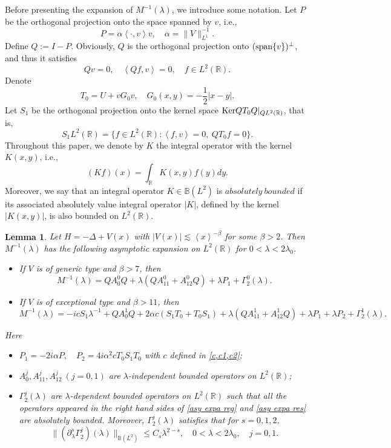\documentclass[reqno]{amsart}
\newtheorem{lemma}[definition]{Lemma}
\newcommand\R{\mathbb{R}}
\newcommand\B{\mathbb{B}}
\numberwithin{equation}{section}
\begin{document}
Before presenting the expansion of $M^{-1}(\lambda)$, we introduce some notation. Let $P$ be the orthogonal projection onto the space spanned by $v$, i.e.,
$$P=\alpha\left<\cdot,v\right>v,\quad \alpha=\|V\|^{-1}_{L^1}.$$
Define $Q:=I-P$. Obviously, $Q$ is the orthogonal projection onto $({\rm span}\{v\})^{\bot}$, and thus it satisfies 
$$Qv=0,\quad \left<Qf,v\right>=0,\quad f\in 
 L^2(\R).$$
Denote $$T_0=U+vG_0v,\quad G_0(x,y)=-\frac{1}{2}|x-y|.$$ 
Let $S_1$ be the orthogonal projection onto the kernel space ${\rm Ker}QT_0Q|_{QL^2(\R)}$, that is,
$$S_1L^2(\R)=\{f\in L^2(\R):\left<f,v\right>=0,\ QT_0f=0\}.$$
Throughout this paper, we denote by $K$ the integral operator with the kernel $K(x,y)$, i.e.,
$$(Kf)(x)=\int_{\R}{}K(x,y)f(y)dy.$$
Moreover, we say that an integral operator $K\in\B(L^2)$ is $absolutely\ bounded$ if its associated absolutely value integral operator $|K|$, defined by the kernel $|K(x,y)|$, is also bounded on $L^2(\R)$. 
\begin{lemma}\label{asy expa lemma}
Let $H=-\Delta+V(x)$ with $|V(x)|\lesssim\left<x\right>^{-\beta}$ for some $\beta>2$. Then $M^{-1}(\lambda)$ has the following asymptotic expansion on $L^2(\R)$ for $0<\lambda<2\lambda_0$.
\begin{itemize}
    \item [{\rm (i)}] If $V$ is of generic type and $\beta>7$, then 
    \begin{equation}\label{asy expa reg}
 M^{-1}(\lambda)=QA^0_0Q+\lambda(QA^0_{11}+A^0_{12}Q)+\lambda{P_1}+\Gamma^0_{2}(\lambda).
\end{equation}
\item [{\rm (ii)}] If $V$ is of exceptional type and $\beta>11$, then
\begin{equation}\label{asy expa res}
 M^{-1}(\lambda)=-icS_1\lambda^{-1}+QA^1_{0}Q+2\alpha c(S_1T_0+T_0S_1)+\lambda\left(QA^1_{11}+A^1_{12}Q\right)+\lambda{P_1}+\lambda P_2+\Gamma^1_{2}(\lambda).
\end{equation}
\end{itemize}
Here 
\begin{itemize}
\item  $ {P_1}=-2i\alpha P,\quad P_2=4i\alpha^2c T_0S_1T_0$ with $c$ defined in \eqref{c,c1,c2};
\vskip0.1cm
\item $A^j_0,A^{j}_{11},A^{j}_{12}\ (j=0,1)$ are $\lambda$-independent bounded operators on $L^2(\R)$; 
\vskip0.1cm
\item $\Gamma^{j}_{2}(\lambda)$ are $\lambda$-dependent bounded operators on $L^2(\R)$ such that all the operators appeared in the right hand sides of \eqref{asy expa reg} and \eqref{asy expa res} are absolutely bounded. Moreover, $\Gamma^{j}_{2}(\lambda)$ satisfies that for $s=0,1,2$,
\begin{equation}\label{estim of gamma}
\|(\partial^{s}_{\lambda}\Gamma^{j}_{2})(\lambda)\|_{\B(L^2)}\leq C_s\lambda^{2-s},\quad 0<\lambda<2\lambda_0,\quad j=0,1.
\end{equation}
\end{itemize}
\end{lemma}
\end{document}
